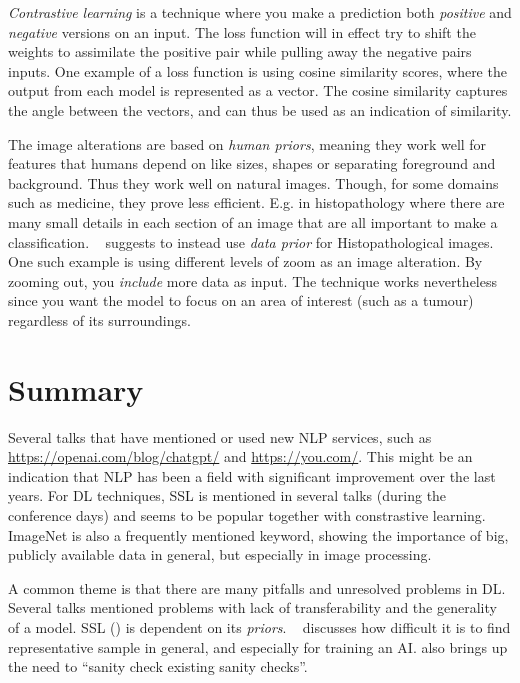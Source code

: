 \documentclass[10pt,twocolumn,letterpaper]{article}
\begin{document}
\label{sec:contrastiveLearning}
\textit{Contrastive learning} is a technique where you make a prediction both \textit{positive} and \textit{negative} versions on an input. The loss function will in effect try to shift the weights to assimilate the positive pair while pulling away the negative pairs inputs. One example of a loss function is using cosine similarity scores, where the output from each model is represented as a vector. The cosine similarity captures the angle between the vectors, and can thus be used as an indication of similarity. 

The image alterations are based on \textit{human priors}, meaning they work well for features that humans depend on like sizes, shapes or separating foreground and background. Thus they work well on natural images. Though, for some domains such as medicine, they prove less efficient. E.g. in histopathology where there are many small details in each section of an image that are all important to make a classification. ~\cite{dataPriors} suggests to instead use \textit{data prior} for Histopathological images. One such example is using different levels of zoom as an image alteration. By zooming out, you \textit{include} more data as input. The technique works nevertheless since you want the model to focus on an area of interest (such as a tumour) regardless of its surroundings.

\section{Summary}\label{sec:summary}
Several talks that have mentioned or used new \gls{NLP} services, such as \href{ChatGPT}{https://openai.com/blog/chatgpt/} and \href{https://you.com/}{https://you.com/}. This might be an indication that \gls{NLP} has been a field with significant improvement over the last years. For \gls{DL} techniques, \gls{SSL} is mentioned in several talks (during the conference days) and seems to be popular together with constrastive learning. ImageNet is also a frequently mentioned keyword, showing the importance of big, publicly available data in general, but especially in image processing.

A common theme is that there are many pitfalls and unresolved problems in \gls{DL}. Several talks mentioned problems with lack of transferability and the generality of a model. \gls{SSL} () is dependent on its \textit{priors}. ~ discusses how difficult it is to find representative sample in general, and especially for training an \gls{AI}.  also brings up the need to ``sanity check existing sanity checks''.
\end{document}
